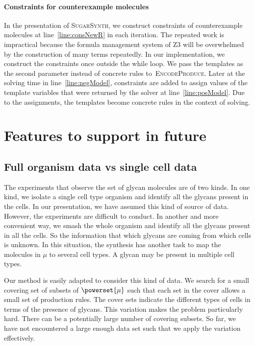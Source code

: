 \paragraph{Constraints for counterexample molecules}
In the presentation of \textsc{SugarSynth}, we construct constraints of counterexample molecules
at line~\ref{line:consNewR} in each iteration.
The repeated work is impractical because the formula management system of Z3 will be overwhelmed by
the construction of many terms repeatedly. In our implementation, we construct the constraints
once outside the while loop.
We pass the templates as the second parameter instead of concrete rules to~\textsc{EncodeProduce}.
Later at the solving time in line~\ref{line:negModel}, constraints are added to assign values
of the template variables that were returned by the solver at line~\ref{line:posModel}.
Due to the assignments, the templates become concrete rules in the context of solving.

\section{Features to support in future}

\subsection{Full organism data vs single cell data}

The experiments that observe the set of glycan molecules are of two kinds. In one kind, we isolate a single cell type organism and identify all the glycans present in the cells. In our presentation, we have assumed this kind of source of data. However, the experiments are difficult to conduct.
In another and more convenient way, we smash the whole organism and identify all the glycans present in all the cells.
So the information that which glycans are coming from which
cells is unknown.
In this situation, the synthesis has another task to map the molecules
in $\mu$ to several cell types.
A glycan may be present in multiple cell types.

Our method is easily adapted to consider this kind of data.
We search for a small covering set of subsets of
$\powerset{\mu}$ such that each set in the cover allows a small
set of production rules.
The cover sets indicate the different types of cells in terms of
the presence of glycans.
This variation makes the problem particularly hard.
There can be a potentially large number of covering subsets.
So far, we have not encountered a large enough data set such that
we apply the variation effectively. 


